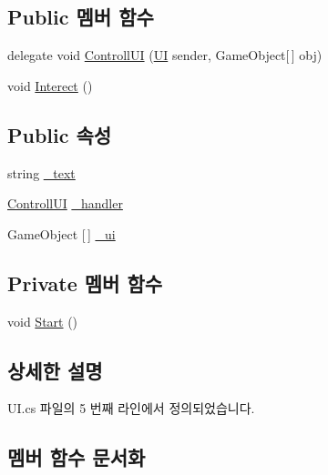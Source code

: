 \subsection*{Public 멤버 함수}
\begin{DoxyCompactItemize}
\item 
delegate void \mbox{\hyperlink{class_u_i_aaf972ce6483c1efd427a579a33b42552}{Controll\+UI}} (\mbox{\hyperlink{class_u_i}{UI}} sender, Game\+Object\mbox{[}$\,$\mbox{]} obj)
\item 
void \mbox{\hyperlink{class_u_i_aaa07d6418e10e4c03f821c8ce95c4fa5}{Interect}} ()
\end{DoxyCompactItemize}
\subsection*{Public 속성}
\begin{DoxyCompactItemize}
\item 
string \mbox{\hyperlink{class_u_i_affa689bbe19b28237e02c9fcaac85585}{\+\_\+text}}
\item 
\mbox{\hyperlink{class_u_i_aaf972ce6483c1efd427a579a33b42552}{Controll\+UI}} \mbox{\hyperlink{class_u_i_abd8fa36b26bb2f28b91ef983d965fa36}{\+\_\+handler}}
\item 
Game\+Object \mbox{[}$\,$\mbox{]} \mbox{\hyperlink{class_u_i_a96cc096c816feecc70b636fa26161d09}{\+\_\+ui}}
\end{DoxyCompactItemize}
\subsection*{Private 멤버 함수}
\begin{DoxyCompactItemize}
\item 
void \mbox{\hyperlink{class_u_i_abab0d820e653a8e381038145e7622814}{Start}} ()
\end{DoxyCompactItemize}


\subsection{상세한 설명}


U\+I.\+cs 파일의 5 번째 라인에서 정의되었습니다.



\subsection{멤버 함수 문서화}
\mbox{\label{class_u_i_aaf972ce6483c1efd427a579a33b42552}} 
